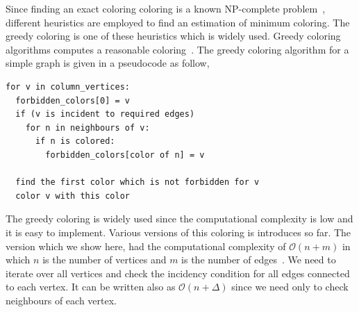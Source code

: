 \documentclass[12pt, oneside]{book}
\begin{document}
Since finding an exact coloring coloring is a known NP-complete problem~\cite{SPINRAD198589},
different heuristics are employed to find an estimation of minimum coloring. The greedy
coloring is one of these heuristics which is widely used. 
Greedy coloring algorithms computes a reasonable coloring~\cite{spaa14}.
The greedy coloring algorithm for a simple graph is given in a pseudocode as follow,
\begin{lstlisting}
for v in column_vertices:
  forbidden_colors[0] = v
  if (v is incident to required edges) 
    for n in neighbours of v:
      if n is colored:
        forbidden_colors[color of n] = v

  find the first color which is not forbidden for v
  color v with this color
\end{lstlisting}
The greedy coloring is widely used since the computational complexity is low and
it is easy to implement. Various versions of this coloring is introduces so far.
The version which we show here, had the computational complexity of 
$\mathcal{O}(n + m)$ in which $n$ is the number of vertices 
and $m$ is the number of edges~\cite{ordering1}.
We need to iterate over all vertices and check the incidency condition for 
all edges connected to each vertex. It can be written also as $\mathcal{O}(n + \Delta)$
since we need only to check neighbours of each vertex.
\end{document}
